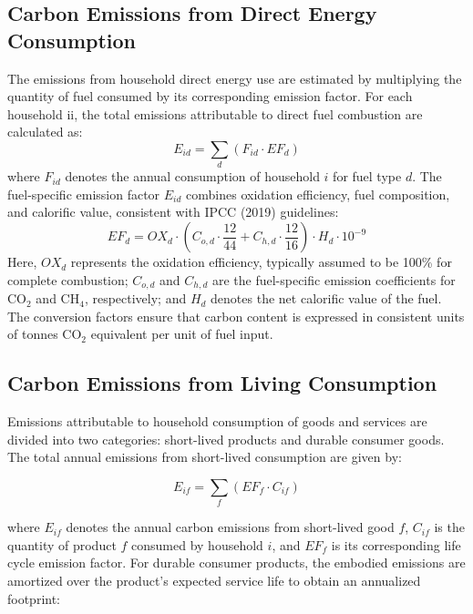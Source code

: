 \documentclass[12pt,a4paper]{article}%
\begin{document}
\subsection{Carbon Emissions from Direct Energy Consumption}
The emissions from household direct energy use are estimated by multiplying the quantity of fuel consumed by its corresponding emission factor. For each household ii, the total emissions attributable to direct fuel combustion are calculated as:
\begin{equation}
E_{id} = \sum_d (F_{id} \cdot EF_d)
\end{equation}
where $F_{id}$ denotes the annual consumption of household $i$  for fuel type $d$. The fuel-specific emission factor $E_{id}$ combines oxidation efficiency, fuel composition, and calorific value, consistent with IPCC (2019) guidelines:
\begin{equation}
EF_d = OX_d \cdot \left(C_{o,d} \cdot \frac{12}{44} + C_{h,d} \cdot \frac{12}{16}\right) \cdot H_d \cdot 10^{-9}
\end{equation}
Here, $OX_d$ represents the oxidation efficiency, typically assumed to be 100\% for complete combustion; $C_{o,d}$ and $C_{h,d}$ are the fuel-specific emission coefficients for CO$_2$ and CH$_4$, respectively; and $H_d$ denotes the net calorific value of the fuel. The conversion factors ensure that carbon content is expressed in consistent units of tonnes CO$_2$ equivalent per unit of fuel input.

\subsection{Carbon Emissions from Living Consumption}

Emissions attributable to household consumption of goods and services are divided into two categories: short-lived products and durable consumer goods. The total annual emissions from short-lived consumption are given by:

\begin{equation}
E_{if} = \sum_f (EF_f \cdot C_{if})
\end{equation}

where $E_{if}$ denotes the annual carbon emissions from short-lived good $f$, $C_{if}$ is the quantity of product $f$ consumed by household $i$, and $EF_f$ is its corresponding life cycle emission factor. For durable consumer products, the embodied emissions are amortized over the product's expected service life to obtain an annualized footprint:
\end{document}

